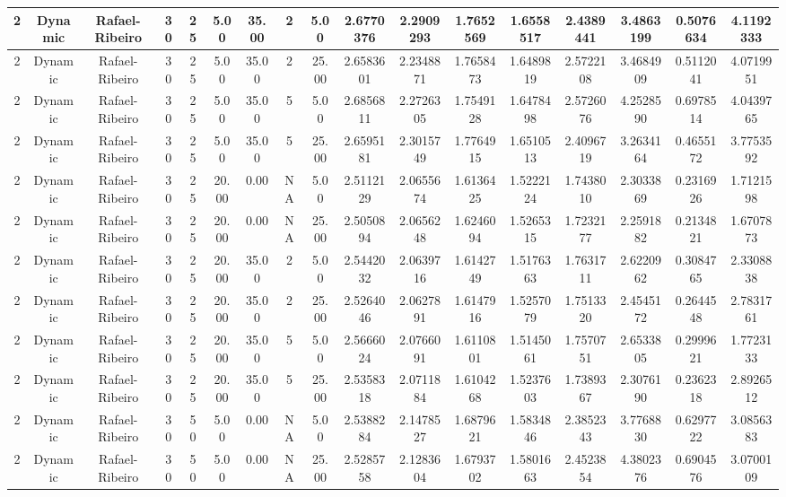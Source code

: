 \documentclass[a4paper]{article}
\begin{document}
\begin{center}
\begin{tabular}{ | c | c | c | c | c | c | c | c | c | c | c | c | c | c | c | c | c | }
		\hline
		2	&	Dynamic	&	Rafael-Ribeiro	&	30	&	25	&	5.00	&	35.00	&	2	&	5.00	&	2.6770376	&	2.2909293	&	1.7652569	&	1.6558517	&	2.4389441	&	3.4863199	&	0.5076634	&	4.1192333 \\
		\hline
		2	&	Dynamic	&	Rafael-Ribeiro	&	30	&	25	&	5.00	&	35.00	&	2	&	25.00	&	2.6583601	&	2.2348871	&	1.7658473	&	1.6489819	&	2.5722108	&	3.4684909	&	0.5112041	&	4.0719951 \\
		\hline
		2	&	Dynamic	&	Rafael-Ribeiro	&	30	&	25	&	5.00	&	35.00	&	5	&	5.00	&	2.6856811	&	2.2726305	&	1.7549128	&	1.6478498	&	2.5726076	&	4.2528590	&	0.6978514	&	4.0439765 \\
		\hline
		2	&	Dynamic	&	Rafael-Ribeiro	&	30	&	25	&	5.00	&	35.00	&	5	&	25.00	&	2.6595181	&	2.3015749	&	1.7764915	&	1.6510513	&	2.4096719	&	3.2634164	&	0.4655172	&	3.7753592 \\
		\hline
		2	&	Dynamic	&	Rafael-Ribeiro	&	30	&	25	&	20.00	&	0.00	&	NA	&	5.00	&	2.5112129	&	2.0655674	&	1.6136425	&	1.5222124	&	1.7438010	&	2.3033869	&	0.2316926	&	1.7121598 \\
		\hline
		2	&	Dynamic	&	Rafael-Ribeiro	&	30	&	25	&	20.00	&	0.00	&	NA	&	25.00	&	2.5050894	&	2.0656248	&	1.6246094	&	1.5265315	&	1.7232177	&	2.2591882	&	0.2134821	&	1.6707873 \\
		\hline
		2	&	Dynamic	&	Rafael-Ribeiro	&	30	&	25	&	20.00	&	35.00	&	2	&	5.00	&	2.5442032	&	2.0639716	&	1.6142749	&	1.5176363	&	1.7631711	&	2.6220962	&	0.3084765	&	2.3308838 \\
		\hline
		2	&	Dynamic	&	Rafael-Ribeiro	&	30	&	25	&	20.00	&	35.00	&	2	&	25.00	&	2.5264046	&	2.0627891	&	1.6147916	&	1.5257079	&	1.7513320	&	2.4545172	&	0.2644548	&	2.7831761 \\
		\hline
		2	&	Dynamic	&	Rafael-Ribeiro	&	30	&	25	&	20.00	&	35.00	&	5	&	5.00	&	2.5666024	&	2.0766091	&	1.6110801	&	1.5145061	&	1.7570751	&	2.6533805	&	0.2999621	&	1.7723133 \\
		\hline
		2	&	Dynamic	&	Rafael-Ribeiro	&	30	&	25	&	20.00	&	35.00	&	5	&	25.00	&	2.5358318	&	2.0711884	&	1.6104268	&	1.5237603	&	1.7389367	&	2.3076190	&	0.2362318	&	2.8926512 \\
		\hline
		2	&	Dynamic	&	Rafael-Ribeiro	&	30	&	50	&	5.00	&	0.00	&	NA	&	5.00	&	2.5388284	&	2.1478527	&	1.6879621	&	1.5834846	&	2.3852343	&	3.7768830	&	0.6297722	&	3.0856383 \\
		\hline
		2	&	Dynamic	&	Rafael-Ribeiro	&	30	&	50	&	5.00	&	0.00	&	NA	&	25.00	&	2.5285758	&	2.1283604	&	1.6793702	&	1.5801663	&	2.4523854	&	4.3802376	&	0.6904576	&	3.0700109 \\
		\hline

\end{tabular}
\end{center}
\end{document}
